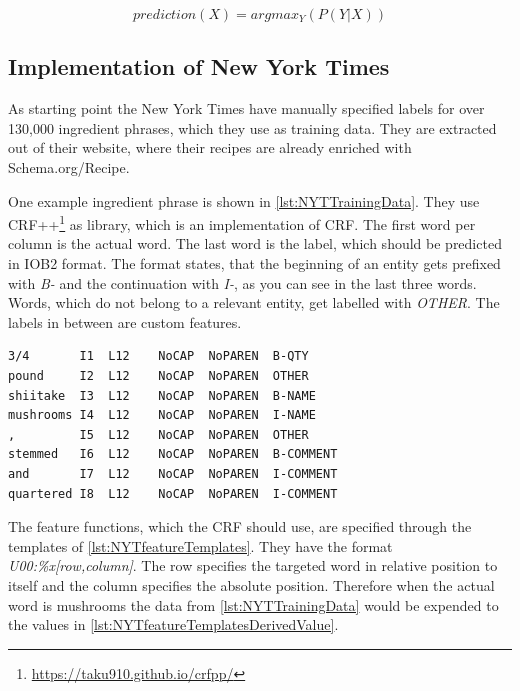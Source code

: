 \documentclass[12pt, twoside]{report}
\begin{document}
\begin{equation}\label{eq:CRF}
prediction(X) = argmax_Y(P(Y|X))
\end{equation}

\subsection{Implementation of New York Times}
As starting point the New York Times have manually specified labels for over 130,000 ingredient phrases, which they use as training data. They are extracted out of their website, where their recipes are already enriched with Schema.org/Recipe.

One example ingredient phrase is shown in \cref{lst:NYTTrainingData}. They use CRF++\footnote{\url{https://taku910.github.io/crfpp/}} as library, which is an implementation of CRF. The first word per column is the actual word. The last word is the label, which should be predicted in IOB2 format. The format states, that the beginning of an entity gets prefixed with \textit{B-} and the continuation with \textit{I-}, as you can see in the last three words. Words, which do not belong to a relevant entity, get labelled with \textit{OTHER}. The labels in between are custom features. 

\begin{lstlisting}[frame=single, caption={Extract of the training data for New York Times CRF}, label=lst:NYTTrainingData]
3/4       I1  L12	 NoCAP	NoPAREN	 B-QTY
pound     I2  L12	 NoCAP	NoPAREN	 OTHER
shiitake  I3  L12	 NoCAP	NoPAREN	 B-NAME
mushrooms I4  L12	 NoCAP	NoPAREN	 I-NAME
,         I5  L12	 NoCAP	NoPAREN	 OTHER
stemmed   I6  L12	 NoCAP	NoPAREN	 B-COMMENT
and       I7  L12	 NoCAP	NoPAREN	 I-COMMENT
quartered I8  L12	 NoCAP	NoPAREN	 I-COMMENT
\end{lstlisting}

The feature functions, which the CRF should use, are specified through the templates of \cref{lst:NYTfeatureTemplates}. They have the format \textit{U00:\%x[row,column]}. The row specifies the targeted word in relative position to itself and the column specifies the absolute position. Therefore when the actual word is mushrooms the data from \cref{lst:NYTTrainingData} would be expended to the values in \cref{lst:NYTfeatureTemplatesDerivedValue}.
\end{document}
